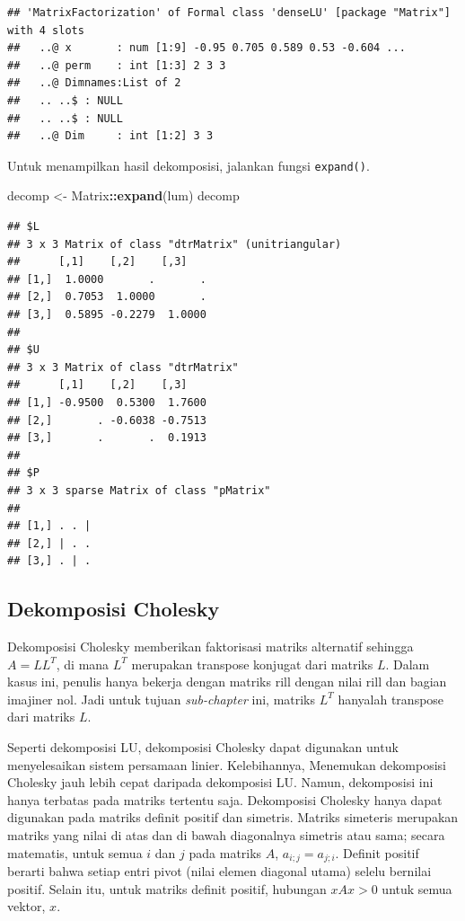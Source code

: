 \documentclass[]{book}
\newenvironment{Shaded}{\begin{snugshade}}{\end{snugshade}}
\newcommand{\KeywordTok}[1]{\textcolor[rgb]{0.13,0.29,0.53}{\textbf{#1}}}
\newcommand{\NormalTok}[1]{#1}
\newcommand{\OperatorTok}[1]{\textcolor[rgb]{0.81,0.36,0.00}{\textbf{#1}}}
\newcommand{\StringTok}[1]{\textcolor[rgb]{0.31,0.60,0.02}{#1}}
\theoremstyle{definition}
\theoremstyle{definition}
\theoremstyle{definition}
\theoremstyle{remark}
\begin{document}
\begin{verbatim}
## 'MatrixFactorization' of Formal class 'denseLU' [package "Matrix"] with 4 slots
##   ..@ x       : num [1:9] -0.95 0.705 0.589 0.53 -0.604 ...
##   ..@ perm    : int [1:3] 2 3 3
##   ..@ Dimnames:List of 2
##   .. ..$ : NULL
##   .. ..$ : NULL
##   ..@ Dim     : int [1:2] 3 3
\end{verbatim}

Untuk menampilkan hasil dekomposisi, jalankan fungsi \texttt{expand()}.

\begin{Shaded}
\begin{Highlighting}[]
\NormalTok{decomp <-}\StringTok{ }\NormalTok{Matrix}\OperatorTok{::}\KeywordTok{expand}\NormalTok{(lum)}
\NormalTok{decomp}
\end{Highlighting}
\end{Shaded}

\begin{verbatim}
## $L
## 3 x 3 Matrix of class "dtrMatrix" (unitriangular)
##      [,1]    [,2]    [,3]   
## [1,]  1.0000       .       .
## [2,]  0.7053  1.0000       .
## [3,]  0.5895 -0.2279  1.0000
## 
## $U
## 3 x 3 Matrix of class "dtrMatrix"
##      [,1]    [,2]    [,3]   
## [1,] -0.9500  0.5300  1.7600
## [2,]       . -0.6038 -0.7513
## [3,]       .       .  0.1913
## 
## $P
## 3 x 3 sparse Matrix of class "pMatrix"
##           
## [1,] . . |
## [2,] | . .
## [3,] . | .
\end{verbatim}

\hypertarget{dekomposisi-cholesky}{%
\subsection{Dekomposisi Cholesky}\label{dekomposisi-cholesky}}

Dekomposisi Cholesky memberikan faktorisasi matriks alternatif sehingga \(A = LL^T\), di mana \(L^T\) merupakan transpose konjugat dari matriks \(L\). Dalam kasus ini, penulis hanya bekerja dengan matriks rill dengan nilai rill dan bagian imajiner nol. Jadi untuk tujuan \emph{sub-chapter} ini, matriks \(L^T\) hanyalah transpose dari matriks \(L\).

Seperti dekomposisi LU, dekomposisi Cholesky dapat digunakan untuk menyelesaikan sistem persamaan linier. Kelebihannya, Menemukan dekomposisi Cholesky jauh lebih cepat daripada dekomposisi LU. Namun, dekomposisi ini hanya terbatas pada matriks tertentu saja. Dekomposisi Cholesky hanya dapat digunakan pada matriks definit positif dan simetris. Matriks simeteris merupakan matriks yang nilai di atas dan di bawah diagonalnya simetris atau sama; secara matematis, untuk semua \(i\) dan \(j\) pada matriks \(A\), \(a_{i;j}=a_{j;i}\). Definit positif berarti bahwa setiap entri pivot (nilai elemen diagonal utama) selelu bernilai positif. Selain itu, untuk matriks definit positif, hubungan \(xAx>0\) untuk semua vektor, \(x\).
\end{document}
